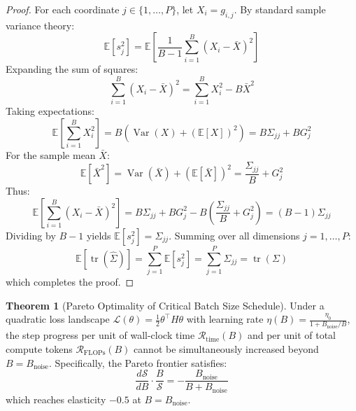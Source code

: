 \documentclass[11pt,a4paper]{article}
\theoremstyle{definition}
\newtheorem{theorem}{\textbf{Theorem}}[section]
\begin{document}
\begin{proof}
For each coordinate $j \in \{1, \dots, P\}$, let $X_i = g_{i, j}$. By standard sample variance theory:
\begin{equation}
\mathbb{E}\left[ s_j^2 \right] = \mathbb{E}\left[ \frac{1}{B - 1} \sum_{i=1}^B (X_i - \bar{X})^2 \right]
\end{equation}
Expanding the sum of squares:
\begin{equation}
\sum_{i=1}^B (X_i - \bar{X})^2 = \sum_{i=1}^B X_i^2 - B \bar{X}^2
\end{equation}
Taking expectations:
\begin{equation}
\mathbb{E}\left[ \sum_{i=1}^B X_i^2 \right] = B \left( \operatorname{Var}(X) + (\mathbb{E}[X])^2 \right) = B \Sigma_{jj} + B G_j^2
\end{equation}
For the sample mean $\bar{X}$:
\begin{equation}
\mathbb{E}\left[ \bar{X}^2 \right] = \operatorname{Var}(\bar{X}) + (\mathbb{E}[\bar{X}])^2 = \frac{\Sigma_{jj}}{B} + G_j^2
\end{equation}
Thus:
\begin{equation}
\mathbb{E}\left[ \sum_{i=1}^B (X_i - \bar{X})^2 \right] = B \Sigma_{jj} + B G_j^2 - B\left( \frac{\Sigma_{jj}}{B} + G_j^2 \right) = (B - 1) \Sigma_{jj}
\end{equation}
Dividing by $B - 1$ yields $\mathbb{E}[s_j^2] = \Sigma_{jj}$.
Summing over all dimensions $j = 1, \dots, P$:
\begin{equation}
\mathbb{E}\left[ \operatorname{tr}(\hat{\Sigma}) \right] = \sum_{j=1}^P \mathbb{E}[s_j^2] = \sum_{j=1}^P \Sigma_{jj} = \operatorname{tr}(\Sigma)
\end{equation}
which completes the proof.
\end{proof}

\begin{theorem}[Pareto Optimality of Critical Batch Size Schedule]
Under a quadratic loss landscape $\mathcal{L}(\theta) = \frac{1}{2} \theta^\top H \theta$ with learning rate $\eta(B) = \frac{\eta_0}{1 + B_{\text{noise}} / B}$, the step progress per unit of wall-clock time $\mathcal{R}_{\text{time}}(B)$ and per unit of total compute tokens $\mathcal{R}_{\text{FLOPs}}(B)$ cannot be simultaneously increased beyond $B = B_{\text{noise}}$. Specifically, the Pareto frontier satisfies:
{\boldmath
\begin{equation}
\frac{d \mathcal{S}}{d B} \cdot \frac{B}{\mathcal{S}} = -\frac{B_{\text{noise}}}{B + B_{\text{noise}}}
\end{equation}
}
which reaches elasticity $-0.5$ at $B = B_{\text{noise}}$.
\end{theorem}
\end{document}
